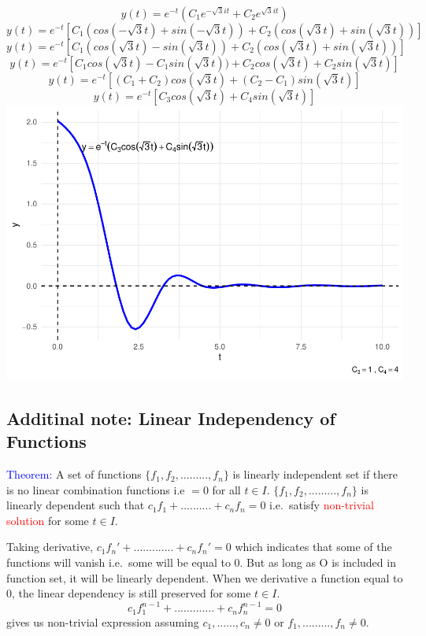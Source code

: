 \documentclass[
  11pt,
]{article}
\begin{document}
\[y(t)=e^{-t}(C_1e^{- \sqrt{3}it}+C_2e^{\sqrt{3}it})\]
\[y(t)=e^{-t}[C_1(cos(-\sqrt{3}t)+sin(-\sqrt{3}t))+C_2(cos(\sqrt{3}t)+sin(\sqrt{3}t))]\]
\[
y(t)=e^{-t}[C_1(cos(\sqrt{3}t)-sin(\sqrt{3}t))+C_2(cos(\sqrt{3}t)+sin(\sqrt{3}t))]
\] \[
y(t)=e^{-t}[C_1cos(\sqrt{3}t)-C_1sin(\sqrt{3}t))+C_2cos(\sqrt{3}t)+C_2sin(\sqrt{3}t)]
\] \[y(t)=e^{-t}[(C_1+C_2)cos(\sqrt{3}t)+(C_2-C_1)sin(\sqrt{3}t)]\] \[
y(t)=e^{-t}[C_3cos(\sqrt{3}t)+C_4sin(\sqrt{3}t)] \tag{2}
\] \includegraphics{differential_files/figure-latex/difference7-1.pdf}
\newpage

\subsection{Additinal note: Linear Independency of
Functions}\label{additinal-note-linear-independency-of-functions}

\textcolor{blue}{Theorem:} A set of functions
\(\{f_1,f_2,.........,f_n\}\) is linearly independent set if there is no
linear combination functions i.e \(=0\) for all \(t \in I\).
\(\{f_1,f_2,.........,f_n\}\) is linearly dependent such that
\(c_1f_1+..........+c_nf_n=0\) i.e.~satisfy
\textcolor{red}{non-trivial solution} for some \(t \in I\).

Taking derivative, \(c_1f_n'+.............+c_nf_n'=0\) which indicates
that some of the functions will vanish i.e.~some will be equal to 0. But
as long as O is included in function set, it will be linearly dependent.
When we derivative a function equal to 0, the linear dependency is still
preserved for some \(t \in I\).
\[c_1f_1^{n-1}+.............+c_nf_n^{n-1}=0\] gives us non-trivial
expression assuming \(c_1,......,c_n \neq 0\) or
\(f_1,.........,f_n \neq 0\).
\end{document}
